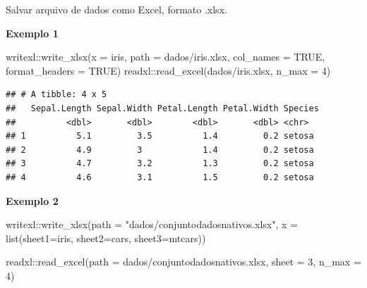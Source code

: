 \documentclass[
]{book}
\newenvironment{Shaded}{\begin{snugshade}}{\end{snugshade}}
\newcommand{\AttributeTok}[1]{\textcolor[rgb]{0.77,0.63,0.00}{#1}}
\newcommand{\ConstantTok}[1]{\textcolor[rgb]{0.00,0.00,0.00}{#1}}
\newcommand{\DecValTok}[1]{\textcolor[rgb]{0.00,0.00,0.81}{#1}}
\newcommand{\FunctionTok}[1]{\textcolor[rgb]{0.00,0.00,0.00}{#1}}
\newcommand{\NormalTok}[1]{#1}
\newcommand{\SpecialCharTok}[1]{\textcolor[rgb]{0.00,0.00,0.00}{#1}}
\newcommand{\StringTok}[1]{\textcolor[rgb]{0.31,0.60,0.02}{#1}}
\theoremstyle{definition}
\theoremstyle{definition}
\theoremstyle{definition}
\theoremstyle{definition}
\theoremstyle{remark}
\begin{document}
Salvar arquivo de dados como Excel, formato .xlsx.

\textbf{Exemplo 1}

\begin{Shaded}
\begin{Highlighting}[]
\NormalTok{writexl}\SpecialCharTok{::}\FunctionTok{write\_xlsx}\NormalTok{(}\AttributeTok{x =}\NormalTok{ iris,}
                    \AttributeTok{path =} \StringTok{\textquotesingle{}dados/iris.xlsx\textquotesingle{}}\NormalTok{,}
                    \AttributeTok{col\_names =} \ConstantTok{TRUE}\NormalTok{,}
                    \AttributeTok{format\_headers =} \ConstantTok{TRUE}\NormalTok{)}
\NormalTok{readxl}\SpecialCharTok{::}\FunctionTok{read\_excel}\NormalTok{(}\StringTok{\textquotesingle{}dados/iris.xlsx\textquotesingle{}}\NormalTok{, }\AttributeTok{n\_max =} \DecValTok{4}\NormalTok{)}
\end{Highlighting}
\end{Shaded}

\begin{verbatim}
## # A tibble: 4 x 5
##   Sepal.Length Sepal.Width Petal.Length Petal.Width Species
##          <dbl>       <dbl>        <dbl>       <dbl> <chr>  
## 1          5.1         3.5          1.4         0.2 setosa 
## 2          4.9         3            1.4         0.2 setosa 
## 3          4.7         3.2          1.3         0.2 setosa 
## 4          4.6         3.1          1.5         0.2 setosa
\end{verbatim}

\textbf{Exemplo 2}

\begin{Shaded}
\begin{Highlighting}[]
\NormalTok{writexl}\SpecialCharTok{::}\FunctionTok{write\_xlsx}\NormalTok{(}\AttributeTok{path =} \StringTok{"dados/conjuntodadosnativos.xlsx"}\NormalTok{,}
           \AttributeTok{x =} \FunctionTok{list}\NormalTok{(}\AttributeTok{sheet1=}\NormalTok{iris, }\AttributeTok{sheet2=}\NormalTok{cars, }\AttributeTok{sheet3=}\NormalTok{mtcars))}

\NormalTok{readxl}\SpecialCharTok{::}\FunctionTok{read\_excel}\NormalTok{(}\AttributeTok{path =} \StringTok{\textquotesingle{}dados/conjuntodadosnativos.xlsx\textquotesingle{}}\NormalTok{,}
                   \AttributeTok{sheet =} \DecValTok{3}\NormalTok{, }
                   \AttributeTok{n\_max =} \DecValTok{4}\NormalTok{)}
\end{Highlighting}
\end{Shaded}
\end{document}
